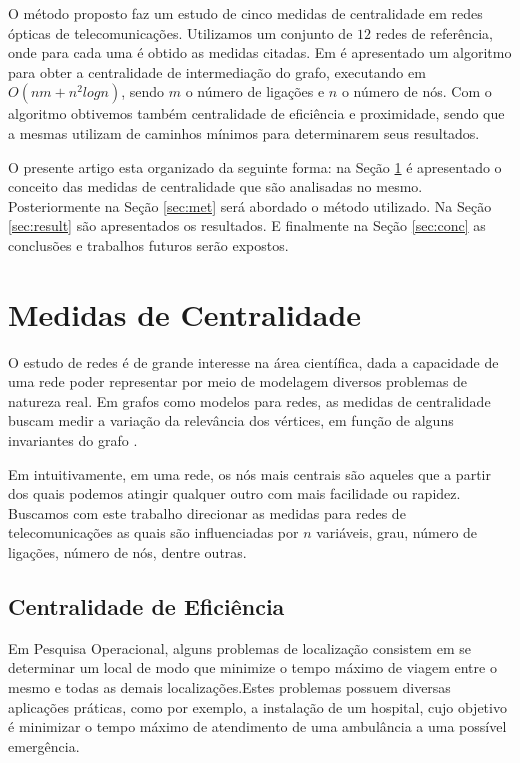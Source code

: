 \documentclass[12pt]{article}
\begin{document}
O método proposto faz um estudo de cinco medidas de centralidade em redes ópticas de telecomunicações.
Utilizamos um conjunto de $12$ redes de referência, onde para cada uma é obtido as medidas citadas.
Em \cite{Brandes01afaster} é apresentado um algoritmo para obter a centralidade de intermediação do grafo, executando em $O(nm + n^2 log n)$, sendo $m$ o número de ligações e $n$ o número de nós.
Com o algoritmo obtivemos também centralidade de eficiência e proximidade, sendo que a mesmas utilizam de caminhos mínimos para determinarem seus resultados.

O presente artigo esta organizado da seguinte forma: na Seção \ref{sec:mc} é apresentado o conceito das medidas de centralidade que são analisadas no mesmo.
Posteriormente na  Seção \ref{sec:met} será abordado o método utilizado. 
Na Seção \ref{sec:result} são apresentados os resultados.
E finalmente na Seção \ref{sec:conc} as conclusões e trabalhos futuros serão expostos. 

\section{Medidas de Centralidade}\label{sec:mc}

O estudo de redes é de grande interesse na área científica, dada a capacidade de uma rede poder representar por meio de modelagem diversos problemas de natureza real.
Em grafos como modelos para redes, as medidas de centralidade buscam medir a variação da relevância dos vértices, em função de alguns invariantes do grafo \cite{freitas}.

Em \cite{freitas} intuitivamente, em uma rede, os nós mais centrais são aqueles que a partir dos quais podemos atingir qualquer outro com mais facilidade ou rapidez. Buscamos com este trabalho direcionar as medidas para redes de telecomunicações as quais são influenciadas por $n$ variáveis, grau, número de ligações, número de nós, dentre outras.

\subsection{Centralidade de Eficiência}
Em  Pesquisa  Operacional,  alguns  problemas  de  localização  consistem  em  se determinar um local de modo que minimize o tempo máximo de viagem entre o mesmo e todas as demais localizações.Estes problemas possuem diversas aplicações práticas, como  por  exemplo,  a  instalação  de  um  hospital,  cujo objetivo  é  minimizar  o  tempo máximo de atendimento de uma ambulância a uma possível emergência\cite{freitas}.
\end{document}
